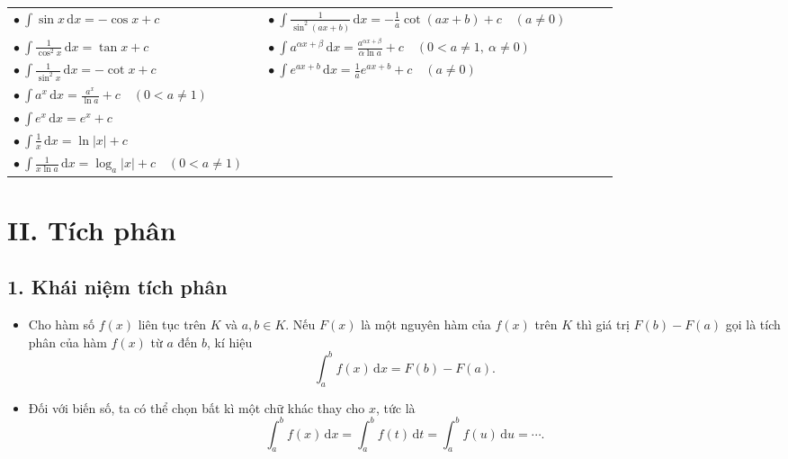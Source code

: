 \documentclass[12pt,a4paper]{article}
\newcommand{\dd}{\,\mathrm{d}}
\newcommand{\ds}{\displaystyle}
\begin{document}
\newpage

\begin{center}
\small
\setlength{\tabcolsep}{3pt}
\renewcommand{\arraystretch}{1.35}

\begin{tabular}{|p{0.40\linewidth}|p{0.55\linewidth}|}
\hline

$\ds\bullet\ \int\sin x\dd x
=-\cos x+c$
&
$\ds\bullet\ \int\frac{1}{\sin^2(ax+b)}\dd x
=-\frac{1}{a}\cot(ax+b)+c
\quad(a\ne0)$
\\

$\ds\bullet\ \int\frac{1}{\cos^2x}\dd x
=\tan x+c$
&
$\ds\bullet\ \int a^{\alpha x+\beta}\dd x
=\frac{a^{\alpha x+\beta}}{\alpha\ln a}+c
\quad(0<a\ne1,\ \alpha\ne0)$
\\

$\ds\bullet\ \int\frac{1}{\sin^2x}\dd x
=-\cot x+c$
&
$\ds\bullet\ \int e^{ax+b}\dd x
=\frac{1}{a}e^{ax+b}+c
\quad(a\ne0)$
\\

$\ds\bullet\ \int a^x\dd x
=\frac{a^x}{\ln a}+c
\quad(0<a\ne1)$
&
\\

$\ds\bullet\ \int e^x\dd x
=e^x+c$
&
\\

$\ds\bullet\ \int\frac{1}{x}\dd x
=\ln|x|+c$
&
\\

$\ds\bullet\ \int\frac{1}{x\ln a}\dd x
=\log_a|x|+c
\quad(0<a\ne1)$
&
\\

\hline
\end{tabular}
\end{center}

\section*{II. Tích phân}

\subsection*{1. Khái niệm tích phân}

\begin{itemize}
\item Cho hàm số $f(x)$ liên tục trên $K$ và $a,b\in K$. Nếu $F(x)$ là một nguyên hàm của $f(x)$ trên $K$ thì giá trị $F(b)-F(a)$ gọi là tích phân của hàm $f(x)$ từ $a$ đến $b$, kí hiệu
\[
\int_a^b f(x)\dd x=F(b)-F(a).
\]
\item Đối với biến số, ta có thể chọn bất kì một chữ khác thay cho $x$, tức là
\[
\int_a^b f(x)\dd x=\int_a^b f(t)\dd t=\int_a^b f(u)\dd u=\cdots.
\]
\end{itemize}
\end{document}
